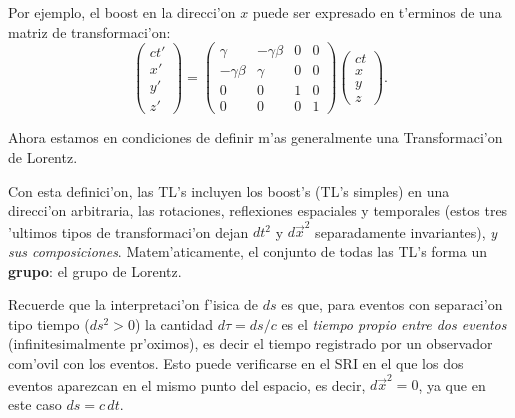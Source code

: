 \begin{center}
\end{center}
Por ejemplo, el boost en la direcci'on $x$ puede ser expresado en t'erminos de una matriz de transformaci'on:
\begin{equation}
 \left(\begin{array}{c} ct' \\ x' \\ y' \\z' \end{array}\right)=\left(
\begin{array}{cccc}
\gamma & -\gamma\beta & 0 &0 \\
-\gamma\beta & \gamma  & 0  & 0 \\
0 & 0 & 1  & 0 \\
0 & 0 & 0  & 1
\end{array}
\right)\left(\begin{array}{c} ct \\ x \\ y \\z \end{array}\right).
\end{equation}

Ahora estamos en condiciones de definir m'as generalmente una Transformaci'on de Lorentz. 

\begin{quotation}
\end{quotation}


Con esta definici'on, las TL's incluyen los boost's (TL's simples) en una direcci'on arbitraria, las rotaciones, reflexiones espaciales y temporales (estos tres 'ultimos tipos de transformaci'on dejan $dt^2$ y $d\vec{x}^2$ separadamente invariantes), \textit{y sus composiciones}. Matem'aticamente, el conjunto de todas las TL's forma un \textbf{grupo}: el grupo de Lorentz.

Recuerde que la interpretaci'on f'isica de $ds$ es que, para eventos con separaci'on tipo tiempo ($ds^2>0$) la cantidad $d\tau=ds/c$ es el \textit{tiempo propio entre dos eventos} (infinitesimalmente pr'oximos), es decir el tiempo registrado por un observador com'ovil con los eventos. Esto puede verificarse en el SRI en el que los dos eventos aparezcan en el mismo punto del espacio, es decir, $d\vec{x}^2=0$, ya que en este caso $ds=c\,dt$.
